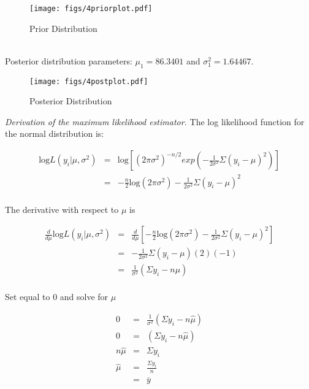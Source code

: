 \documentclass[12pt]{article}
\newcommand{\ybar}{\overline{y}}
\begin{document}
\begin{figure}[H]
\begin{center}
\texttt{[image: figs/4priorplot.pdf]}
\caption{Prior Distribution}
\end{center}
\end{figure}
\ \\ [-1.5cm]

\noindent Posterior distribution parameters: $\mu_1=86.3401$ and $\sigma_1^2=1.64467$. \\ [-.8cm]

\begin{figure}[H]
\begin{center}
\texttt{[image: figs/4postplot.pdf]}
\caption{Posterior Distribution}
\end{center}
\end{figure}

\noindent \textit{Derivation of the maximum likelihood estimator.}  The log likelihood function for the normal distribution is:

\begin{eqnarray*}
\mathrm{log}L(y_i|\mu,\sigma^2) &=& \mathrm{log}\left[(2\pi\sigma^2)^{-n/2}exp\left(-\frac{1}{2\sigma^2}\Sigma(y_i-\mu)^2\right)\right] \\
&=& -\frac{n}{2}\mathrm{log}(2\pi\sigma^2)-\frac{1}{2\sigma^2}\Sigma(y_i-\mu)^2 \\
\end{eqnarray*}

The derivative with respect to $\mu$ is

\begin{eqnarray*}
\frac{d}{d\mu}\mathrm{log}L(y_i|\mu,\sigma^2) &=& \frac{d}{d\mu}\left[-\frac{n}{2}\mathrm{log}(2\pi\sigma^2)-\frac{1}{2\sigma^2}\Sigma(y_i-\mu)^2\right] \\
&=& -\frac{1}{2\sigma^2}\Sigma(y_i-\mu)(2)(-1) \\
&=& \frac{1}{\sigma^2}(\Sigma y_i-n\mu) \\
\end{eqnarray*}

Set equal to 0 and solve for $\hat{\mu}$

\begin{eqnarray*}
0 &=& \frac{1}{\sigma^2}(\Sigma y_i-n\hat{\mu}) \\
0 &=& (\Sigma y_i-n\hat{\mu}) \\
n\hat{\mu} &=& \Sigma y_i \\
\hat{\mu} &=& \frac{\Sigma y_i}{n} \\
&=& \ybar \\
\end{eqnarray*}
\end{document}
